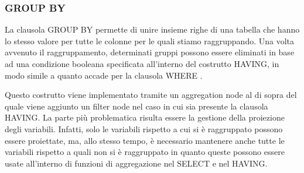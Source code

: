 \subsubsection*{GROUP BY}
La clausola GROUP BY permette di unire insieme righe di una tabella che hanno lo stesso valore per tutte le colonne per le quali stiamo 
raggruppando. Una volta avvenuto il raggruppamento, determinati gruppi possono essere eliminati in base ad una condizione booleana
specificata all'interno del costrutto HAVING, in modo simile a quanto accade per la clausola WHERE \cite{PGGroupBy}.

Questo costrutto viene implementato tramite un aggregation node al di sopra del quale viene aggiunto un filter node nel caso in cui sia presente 
la clausola HAVING. La parte più problematica risulta essere la gestione della proiezione degli variabili. Infatti, solo le variabili rispetto 
a cui si è raggruppato possono essere proiettate, ma, allo stesso tempo, è necessario mantenere anche tutte le variabili rispetto a quali non si
è raggruppato in quanto queste possono essere usate all'interno di funzioni di aggregazione nel SELECT e nel HAVING. 

